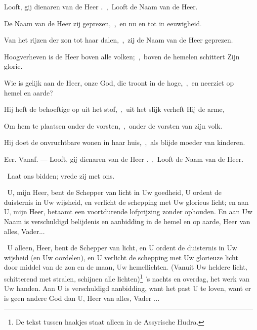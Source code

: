 \documentclass[12pt,twoside,a5paper]{article}
\begin{document}
\begin{halfparskip}
   Looft, gij dienaren van de Heer .~\sep\ Looft de Naam van de Heer.

   

  De Naam van de Heer zij geprezen,~\sep\ en nu en tot in eeuwigheid.

  Van het rijzen der zon tot haar dalen,~\sep\ zij de Naam van de Heer geprezen.

  Hoogverheven is de Heer boven alle volken;~\sep\ boven de hemelen schittert Zijn glorie.

  Wie is gelijk aan de Heer, onze God, die troont in de hoge,~\sep\ en neerziet op hemel en aarde?

  Hij heft de behoeftige op uit het stof,~\sep\ uit het slijk verheft Hij de arme,

  Om hem te plaatsen onder de vorsten,~\sep\ onder de vorsten van zijn volk.

  Hij doet de onvruchtbare wonen in haar huis,~\sep\ als blijde moeder van kinderen.

  Eer. Vanaf. --- Looft, gij dienaren van de Heer .~\sep\ Looft de Naam van de Heer.

\end{halfparskip}

\begin{halfparskip}
  \dd~Laat ons bidden; vrede zij met ons.

   \cc~U, mijn Heer, bent de Schepper van licht in Uw goedheid, U ordent de duisternis in Uw wijsheid, en verlicht de schepping met Uw glorieus licht; en aan U, mijn Heer, betaamt een voortdurende lofprijzing zonder ophouden. En aan Uw Naam is verschuldigd belijdenis en aanbidding in de hemel en op aarde, Heer van alles, Vader...

   \cc~U alleen, Heer, bent de Schepper van licht, en U ordent de duisternis in Uw wijsheid (en Uw oordelen), en U verlicht de schepping met Uw glorieuze licht door middel van de zon en de maan, Uw hemellichten. (Vanuit Uw heldere licht, schitterend met stralen, schijnen alle lichten)\footnote{De tekst tussen haakjes staat alleen in de Assyrische Hudra.} 's nachts en overdag, het werk van Uw handen. Aan U is verschuldigd aanbidding, want het past U te loven, want er is geen andere God dan U, Heer van alles, Vader ...
\end{halfparskip}
\end{document}

